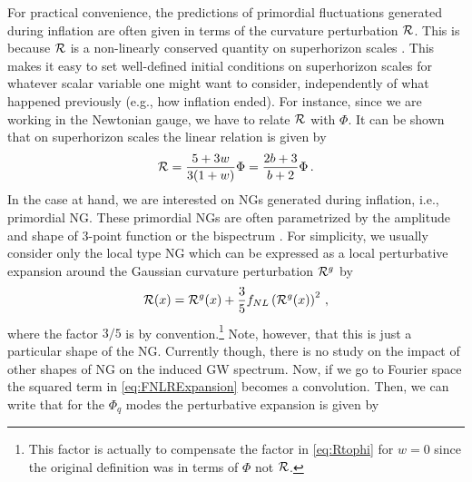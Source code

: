\documentclass[a4paper,11pt]{article}
\numberwithin{equation}{section}
\begin{document}
For practical convenience, the predictions of primordial fluctuations generated during inflation are often given in terms of the curvature perturbation ${\cal R}$. This is because ${\cal R}$ is a non-linearly conserved quantity on superhorizon scales \cite{Lyth:2004gb}. This makes it easy to set well-defined initial conditions on superhorizon scales for whatever scalar variable one might want to consider, independently of what happened previously (e.g., how inflation ended). For instance, since we are working in the Newtonian gauge, we have to relate ${\cal R}$ with $\Phi$. It can be shown that on superhorizon scales the linear relation is given by \cite{Mukhanov:2005sc}
\begin{equation}\label{eq:Rtophi}
{\cal R}=\frac{5+3w}{3(1+w)}\Phi=\frac{2b+3}{b+2}\Phi\,.
\end{equation}
In the case at hand, we are interested on NGs generated during inflation, i.e., primordial NG. These primordial NGs are often parametrized by the amplitude and shape of 3-point function or the bispectrum \cite{Komatsu:2010hc,Bartolo:2010qu}. For simplicity, we usually consider only the local type NG which can be expressed as a local perturbative expansion around the Gaussian curvature perturbation ${\cal R}^g$ by
\begin{equation}\label{eq:FNLRExpansion}
{\cal R}(x)={\cal R}^g(x)+\frac{3}{5}f_{NL}\left({\cal R}^g(x)\right)^2\,,
\end{equation}
where the factor $3/5$ is by convention.\footnote{This factor is actually to compensate the factor in \eqref{eq:Rtophi} for $w=0$ since the original definition \cite{Komatsu:2003iq} was in terms of $\Phi$ not ${\cal R}$.} Note, however, that this is just a particular shape of the NG. Currently though, there is no study on the impact of other shapes of NG on the induced GW spectrum. Now, if we go to Fourier space the squared term in \eqref{eq:FNLRExpansion} becomes a convolution. Then, we can write that for the $\Phi_q$ modes the perturbative expansion is given by
\end{document}
